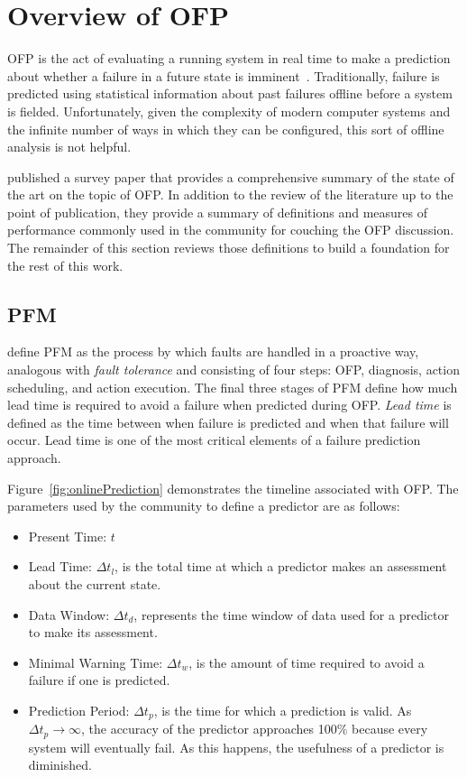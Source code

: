 \section{Overview of \acrfull{OFP}} \label{chapter2}
\ac{OFP} is the act of evaluating a running system in real time to make a
prediction about whether a failure in a future state is
imminent~\citep{salfnerSurvey}.  Traditionally, failure is predicted using
statistical information about past failures offline before a system is fielded.
Unfortunately, given the complexity of modern computer systems and the infinite
number of ways in which they can be configured, this sort of offline analysis
is not helpful.

\citet{salfnerSurvey} published a survey paper that provides a comprehensive
summary of the state of the art on the topic of \ac{OFP}.  In addition to the
review of the literature up to the point of publication, they provide a summary
of definitions and measures of performance commonly used in the community for
couching the \ac{OFP} discussion.  The remainder of this section reviews those
definitions to build a foundation for the rest of this work.

\subsection{\acrfull{PFM}} \label{pfm}
\citet{salfnerSurvey} define \ac{PFM} as the process by which faults are
handled in a proactive way, analogous with \emph{fault tolerance} and
consisting of four steps: \ac{OFP}, diagnosis, action scheduling, and action
execution.  The final three stages of \ac{PFM} define how much lead time is
required to avoid a failure when predicted during \ac{OFP}.  \emph{Lead time}
is defined as the time between when failure is predicted and when that failure
will occur.  Lead time is one of the most critical elements of a failure
prediction approach.


Figure~\ref{fig:onlinePrediction} demonstrates the timeline associated with
\ac{OFP}.  The parameters used by the community to define a predictor are as
follows:
\begin{itemize}
	\item{Present Time: $t$}
  \item{Lead Time: $\Delta t_{l}$, is the total time at which a predictor makes
  an assessment about the current state.}
  \item{Data Window: $\Delta t_{d}$, represents the time window of data used
  for a predictor to make its assessment.}
  \item{Minimal Warning Time: $\Delta t_{w}$, is the amount of time required to
  avoid a failure if one is predicted.}
  \item{Prediction Period: $\Delta t_{p}$, is the time for which a prediction
  is valid.  As $\Delta t_{p} \rightarrow \infty$, the accuracy of the
  predictor approaches 100\% because every system will eventually fail.  As
  this happens, the usefulness of a predictor is diminished.}
\end{itemize}

